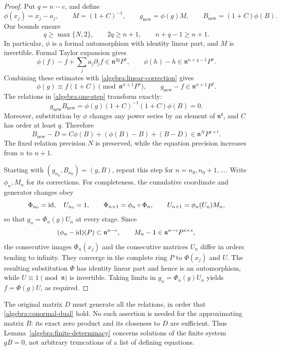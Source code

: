 \begin{proof}
Put $q=n-c$, and define
\begin{equation}
\label{algebra:one-step}
 \phi(x_j)=x_j-a_j,\qquad M=(1+C)^{-1},\qquad
 g_{\mathrm{new}}=\phi(g)M,\qquad
 B_{\mathrm{new}}=(1+C)\phi(B).
\end{equation}
Our bounds ensure
\[
 q\ge\max\{N,2\},\qquad 2q\ge n+1,
 \qquad n+q-1\ge n+1.
\]
In particular, $\phi$ is a formal automorphism with identity linear part,
and $M$ is invertible.  Formal Taylor expansion gives
\[
 \phi(f)-f+\sum_j a_j\partial_jf\in\mathfrak n^{2q}P^s,
 \qquad
 \phi(h)-h\in\mathfrak n^{n+q-1}P^s.
\]
Combining these estimates with \eqref{algebra:linear-correction} gives
\[
 \phi(g)\equiv f(1+C)\pmod{\mathfrak n^{n+1}P^s},
 \qquad
 g_{\mathrm{new}}-f\in\mathfrak n^{n+1}P^s.
\]
The relations in \eqref{algebra:one-step} transform exactly:
\[
 g_{\mathrm{new}}B_{\mathrm{new}}
 =\phi(g)(1+C)^{-1}(1+C)\phi(B)=0.
\]
Moreover, substitution by $\phi$ changes any power series by an element
of $\mathfrak n^q$, and $C$ has order at least $q$.  Therefore
\[
 B_{\mathrm{new}}-D
 =C\phi(B)+(\phi(B)-B)+(B-D)
 \in\mathfrak n^NP^{s\times t}.
\]
The fixed relation precision $N$ is preserved, while the equation
precision increases from $n$ to $n+1$.

Starting with $(g_{n_0},B_{n_0})=(g,B)$, repeat this step for
$n=n_0,n_0+1,\ldots$.  Write $\phi_n,M_n$ for its corrections.
For completeness, the cumulative coordinate and generator changes obey
\[
 \Phi_{n_0}=\operatorname{id},\quad U_{n_0}=1,\qquad
 \Phi_{n+1}=\phi_n\circ\Phi_n,\qquad
 U_{n+1}=\phi_n(U_n)M_n,
\]
so that $g_n=\Phi_n(g)U_n$ at every stage.  Since
\[
 (\phi_n-\operatorname{id})(P)\subset\mathfrak n^{n-c},
 \qquad M_n-1\in\mathfrak n^{n-c}P^{s\times s},
\]
the consecutive images $\Phi_n(x_j)$ and the consecutive matrices
$U_n$ differ in orders tending to infinity.  They converge in the
complete ring $P$ to $\Phi(x_j)$ and $U$.  The resulting substitution
$\Phi$ has identity linear part and hence is an automorphism, while
$U\equiv1\pmod{\mathfrak n}$ is invertible.  Taking limits in
$g_n=\Phi_n(g)U_n$ yields $f=\Phi(g)U$, as required.
\end{proof}

The original matrix $D$ must generate all the relations, in order that
\eqref{algebra:conormal-dual} hold.  No such assertion is needed for the
approximating matrix $B$: its exact zero product and its closeness to
$D$ are sufficient.  Thus Lemma~\ref{algebra:finite-determinacy} concerns
solutions of the finite system $gB=0$, not arbitrary truncations of a
list of defining equations.

